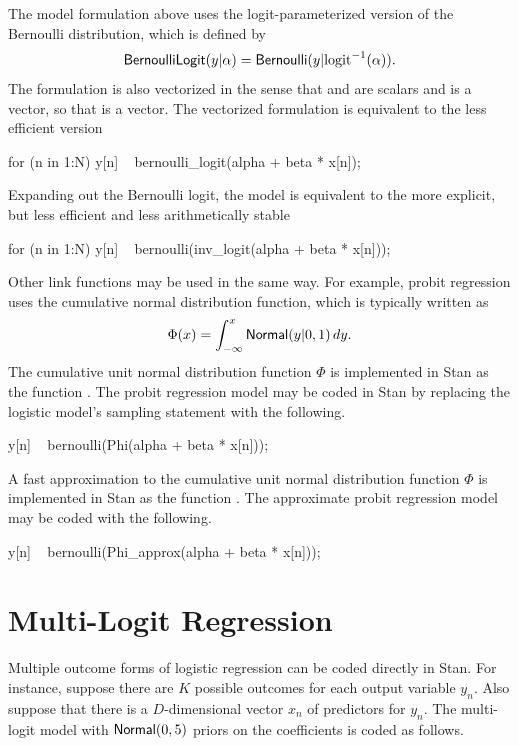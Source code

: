 The model formulation above uses the logit-parameterized version of
the Bernoulli distribution, which is defined by 
%
\[
\distro{BernoulliLogit}(y|\alpha) 
=
\distro{Bernoulli}(y | \mbox{logit}^{-1}(\alpha)).
\]
%
The formulation is also vectorized in the sense that  and
 are scalars and  is a vector, so that  is a vector.  The vectorized formulation is equivalent
to the less efficient version
%

\begin{stancode}
for (n in 1:N)
  y[n] ~ bernoulli_logit(alpha + beta * x[n]);
\end{stancode}
%
Expanding out the Bernoulli logit, the model is equivalent to the more
explicit, but less efficient and less arithmetically stable
%

\begin{stancode}
for (n in 1:N)
  y[n] ~ bernoulli(inv_logit(alpha + beta * x[n]));
\end{stancode}

Other link functions may be used in the same way.  For example, probit
regression uses the cumulative normal distribution function, which is
typically written as 
\[
\Phi(x) = \int_{-\infty}^x \distro{Normal}(y|0,1) \, dy.
\]
%
The cumulative unit normal distribution function $\Phi$ is implemented
in Stan as the function .  The probit regression model
may be coded in Stan by replacing the logistic model's sampling
statement with the following.
%

\begin{stancode}
        y[n] ~ bernoulli(Phi(alpha + beta * x[n]));
\end{stancode}
%
A fast approximation to the cumulative unit normal distribution function 
$\Phi$ is implemented in Stan as the function .  The 
approximate probit regression model may be coded with the following.
%

\begin{stancode}
        y[n] ~ bernoulli(Phi_approx(alpha + beta * x[n]));
\end{stancode}

\section{Multi-Logit Regression}\label{multi-logit.section}

Multiple outcome forms of logistic regression can be coded directly in
Stan.  For instance, suppose there are $K$ possible outcomes for each
output variable $y_n$.  Also suppose that there is a $D$-dimensional
vector $x_n$ of predictors for $y_n$.  The multi-logit model with
$\distro{Normal}(0,5)$ priors on the coefficients is coded as follows.
%

